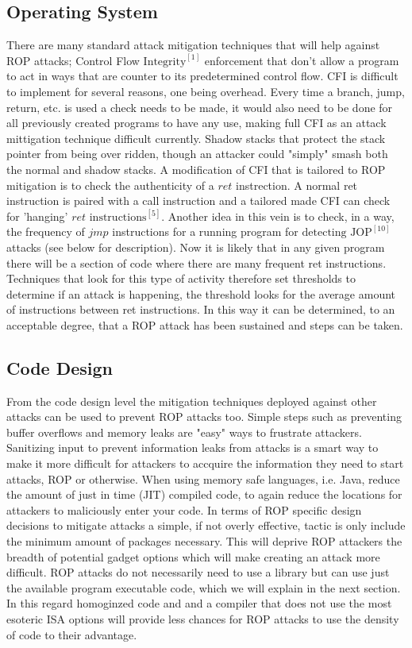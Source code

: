 \documentclass[11pt]{amsart}
\begin{document}
\subsection*{Operating System}
There are many standard attack mitigation techniques that will help against ROP attacks; Control Flow $\text{Integrity}^{[1]}$ enforcement that don't allow a program to act in ways that are counter to its predetermined control flow. CFI is difficult to implement for several reasons, one being overhead. Every time a branch, jump, return, etc. is used a check needs to be made, it would also need to be done for all previously created programs to have any use, making full CFI as an attack mittigation technique difficult currently. Shadow stacks that protect the stack pointer from being over ridden, though an attacker could "simply" smash both the normal and shadow stacks. \newline \newline
A modification of CFI that is tailored to ROP mitigation is to check the authenticity of a $ret$ instrection. A normal ret instruction is paired with a call instruction and a tailored made CFI can check for 'hanging' $ret$ $\text{instructions}^{[5]}$. Another idea in this vein is to check, in a way, the frequency of $jmp$ instructions for a running program for $\text{detecting JOP}^{[10]}$ attacks (see below for description). Now it is likely that in any given program there will be a section of code where there are many frequent ret instructions. Techniques that look for this type of activity therefore set thresholds to determine if an attack is happening, the threshold looks for the average amount of instructions between ret instructions. In this way it can be determined, to an acceptable degree, that a ROP attack has been sustained and steps can be taken.
\subsection*{Code Design}
From the code design level the mitigation techniques deployed against other attacks can be used to prevent ROP attacks too. Simple steps such as preventing buffer overflows and memory leaks are "easy" ways to frustrate attackers. Sanitizing input to prevent information leaks from attacks is a smart way to make it more difficult for attackers to accquire the information they need to start attacks, ROP or otherwise. When using memory safe languages, i.e. Java, reduce the amount of just in time (JIT) compiled code, to again reduce the locations for attackers to maliciously enter your code.\newline \newline
In terms of ROP specific design decisions to mitigate attacks a simple, if not overly effective, tactic is only include the minimum amount of packages necessary. This will deprive ROP attackers the breadth of potential gadget options which will make creating an attack more difficult. ROP attacks do not necessarily need to use a library but can use just the available program executable code, which we will explain in the next section. In this regard homoginzed code and and a compiler that does not use the most esoteric ISA options will provide less chances for ROP attacks to use the density of code to their advantage.
\end{document}
